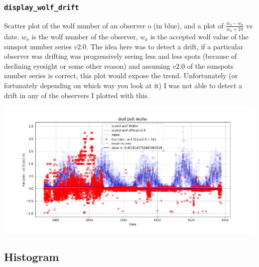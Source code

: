 \documentclass[12pt]{article}
\begin{document}
\subsubsection{\texttt{display\_wolf\_drift}}
Scatter plot of the wolf number of an observer o (in blue), and a plot of $\frac{w_o - w_a}{w_a + 10}$ vs date. $w_o$ is the wolf number of the observer, $w_a$ is the accepted wolf value of the sunspot number series $v 2.0$. The idea here was to detect a drift, if a particular observer was drifting was progressively seeing less and less spots (because of declining eyesight or some other reason) and assuming $v 2.0$ of the sunspots number series is correct, this plot would expose the trend. Unfortunately (or fortunately depending on which way you look at it) I was not able to detect a drift in any of the observers I plotted with this. \\

{\centering
\caption{}
\includegraphics[width=\linewidth]{wolfer_drift.png}
\label{}
\par}



\subsection{Histogram}
\end{document}
